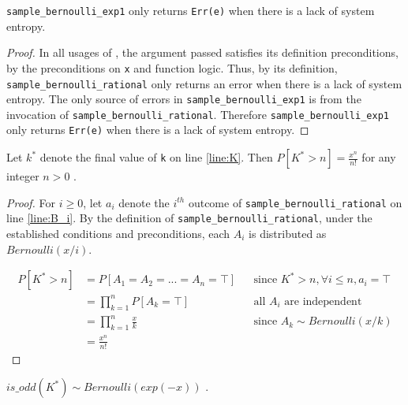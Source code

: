 \documentclass{article}
\begin{document}
\begin{lemma} 
    \label{err-e} 
    \texttt{sample\_bernoulli\_exp1} only returns \texttt{Err(e)} when there is a lack of system entropy. 
\end{lemma} 
 
\begin{proof} 
    In all usages of , the argument passed satisfies its definition preconditions,  
    by the preconditions on \texttt{x} and function logic. 
    Thus, by its definition, \texttt{sample\_bernoulli\_rational} only returns an error when there is a lack of system entropy. 
    The only source of errors in \texttt{sample\_bernoulli\_exp1} is from the invocation of \texttt{sample\_bernoulli\_rational}. 
    Therefore \texttt{sample\_bernoulli\_exp1} only returns \texttt{Err(e)} when there is a lack of system entropy. 
\end{proof} 
 
\begin{lemma} 
    \label{P_K_gt_n} 
    Let $k^{*}$ denote the final value of \texttt{k} on line \ref{line:K}. 
    Then $P[K^{*} > n] = \frac{x^n}{n!}$ for any integer $n > 0$ \cite{CKS20}. 
\end{lemma} 
 
\begin{proof} 
    For $i \ge 0$, let $a_i$ denote the $i^{th}$ outcome of \texttt{sample\_bernoulli\_rational} on line \ref{line:B_i}. 
    By the definition of \texttt{sample\_bernoulli\_rational}, under the established conditions and preconditions, 
    each $A_i$ is distributed as $Bernoulli(x / i)$. 
 
    \begin{align*} 
        P[K^{*} > n] &= P[A_1 = A_2 = ... = A_n = \top] && \text{since } K^{*} > n, \forall i \leq n, a_i = \top \\ 
        &= \prod_{k=1}^n P[A_k = \top] && \text{all $A_i$ are independent} \\ 
        &= \prod_{k=1}^n \frac{x}{k} && \text{since $A_k \sim Bernoulli(x/k)$} \\ 
        &= \frac{x^n}{n!} 
    \end{align*} 
\end{proof} 
 
\begin{lemma} 
    \label{ok-out} 
    $is\_odd(K^{*}) \sim Bernoulli(exp(-x))$ \cite{CKS20}. 
\end{lemma} 
 
\end{document}
